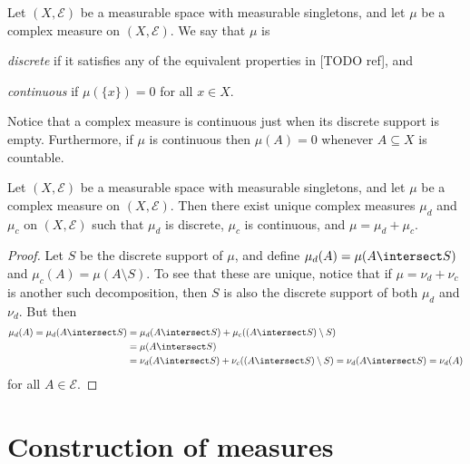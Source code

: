 \documentclass[article, a4paper, 11pt, oneside]{memoir}
\numberwithin{equation}{chapter}
\newcommand{\calE}{\mathcal{E}}
\newcommand{\calP}{\mathcal{P}}
\begin{document}
\begin{definition}
    Let $(X,\calE)$ be a measurable space with measurable singletons, and let $\mu$ be a complex measure on $(X,\calE)$. We say that $\mu$ is
    \begin{enumdef}
        \item \emph{discrete} if it satisfies any of the equivalent properties in [TODO ref], and
        \item \emph{continuous} if $\mu(\{x\}) = 0$ for all $x \in X$.
    \end{enumdef}
\end{definition}
%
Notice that a complex measure is continuous just when its discrete support is empty. Furthermore, if $\mu$ is continuous then $\mu(A) = 0$ whenever $A \subseteq X$ is countable.


\begin{proposition}
    Let $(X,\calE)$ be a measurable space with measurable singletons, and let $\mu$ be a complex measure on $(X,\calE)$. Then there exist unique complex measures $\mu_d$ and $\mu_c$ on $(X,\calE)$ such that $\mu_d$ is discrete, $\mu_c$ is continuous, and $\mu = \mu_d + \mu_c$.
\end{proposition}

\begin{proof}
    Let $S$ be the discrete support of $\mu$, and define $\mu_d(A) = \mu(A \intersect S)$ and $\mu_c(A) = \mu(A \setminus S)$. To see that these are unique, notice that if $\mu = \nu_d + \nu_c$ is another such decomposition, then $S$ is also the discrete support of both $\mu_d$ and $\nu_d$. But then
    \begin{align*}
        \mu_d(A)
             = \mu_d(A \intersect S)
            &= \mu_d(A \intersect S) + \mu_c((A \intersect S) \setminus S) \\
            &= \mu(A \intersect S) \\
            &= \nu_d(A \intersect S) + \nu_c((A \intersect S) \setminus S)
             = \nu_d(A \intersect S)
             = \nu_d(A)
    \end{align*}
    for all $A \in \calE$.
\end{proof}


\section{Construction of measures}

\renewcommand{\powerset}[1]{\calP(#1)}
\end{document}
